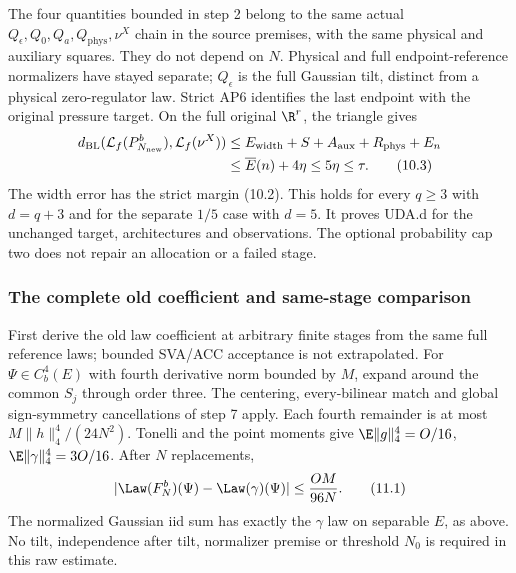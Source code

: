 The four quantities bounded in step 2 belong to the same actual
$Q_\epsilon,Q_0,Q_a,Q_{\mathrm{phys}},\nu^X$ chain in the source premises,
with the same physical and auxiliary squares. They do not depend on $N$.
Physical and full endpoint-reference normalizers have stayed separate;
$Q_\epsilon$ is the full Gaussian tilt, distinct from a physical
zero-regulator law. Strict AP6 identifies the last endpoint with the
original pressure target. On the full original $\R^r$, the triangle gives
\begin{align}
 d_{\mathrm{BL}}(\mathcal L_f(P_{N_{\mathrm{new}}}^b),\mathcal L_f(\nu^X))
 &\le E_{\mathrm{width}}+S+A_{\mathrm{aux}}+R_{\mathrm{phys}}+E_n\notag\\
 &\le\overline E(n)+4\eta\le5\eta\le\tau.\tag{10.3}
\end{align}
The width error has the strict margin (10.2). This holds for every
$q\ge3$ with $d=q+3$ and for the separate $1/5$ case with $d=5$.
It proves UDA.d for the unchanged target, architectures and observations.
The optional probability cap two does not repair an allocation or a failed stage.

\subsubsection{The complete old coefficient and same-stage comparison}
First derive the old law coefficient at arbitrary finite stages from the
same full reference laws; bounded SVA/ACC acceptance is not extrapolated.
For $\Psi\in C_b^4(E)$ with fourth derivative norm bounded by $M$,
expand around the common $S_j$ through order three. The centering,
every-bilinear match and global sign-symmetry cancellations of step 7
apply. Each fourth remainder is at most $M\|h\|_4^4/(24N^2)$.
Tonelli and the point moments give
$\E\|g\|_4^4=O/16$, $\E\|\gamma\|_4^4=3O/16$.
After $N$ replacements,
\begin{equation}
 |\Law(F_N^b)(\Psi)-\Law(\gamma)(\Psi)|\le\frac{OM}{96N}.\tag{11.1}
\end{equation}
The normalized Gaussian iid sum has exactly the $\gamma$ law on separable
$E$, as above. No tilt, independence after tilt, normalizer premise or
threshold $N_0$ is required in this raw estimate.

